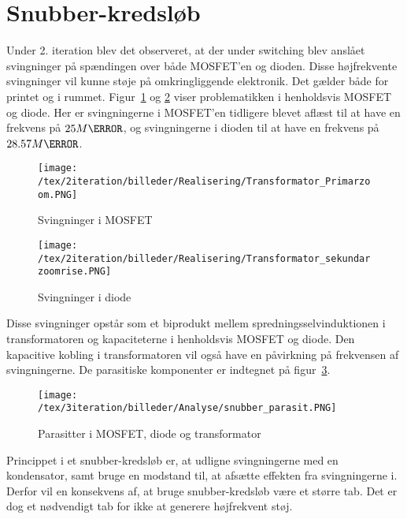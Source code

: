 
\section{Snubber-kredsløb}
Under 2. iteration blev det observeret, at der under switching blev anslået svingninger på spændingen over både MOSFET'en og dioden. Disse højfrekvente svingninger vil kunne støje på omkringliggende elektronik. Det gælder både for printet og i rummet. Figur~\ref{fig:MOSFET_svingninger_2} og \ref{fig:diode_svingninger_2} viser problematikken i henholdsvis MOSFET og diode. Her er svingningerne i MOSFET'en tidligere blevet aflæst til at have en frekvens på $25M\hertz$, og svingningerne i dioden til at have en frekvens på $28.57M\hertz$. 

\begin{figure}[H]
	\center
	\texttt{[image: /tex/2iteration/billeder/Realisering/Transformator\_Primarzoom.PNG]}
	\caption{Svingninger i MOSFET}
	\label{fig:MOSFET_svingninger_2}
\end{figure}

\begin{figure}[H]
	\center
	\texttt{[image: /tex/2iteration/billeder/Realisering/Transformator\_sekundarzoomrise.PNG]}
	\caption{Svingninger i diode}
	\label{fig:diode_svingninger_2}
\end{figure}


\noindent Disse svingninger opstår som et biprodukt mellem spredningsselvinduktionen i transformatoren og kapaciteterne i henholdsvis MOSFET og diode. Den kapacitive kobling i transformatoren vil også have en påvirkning på frekvensen af svingningerne. De parasitiske komponenter er indtegnet på figur~\ref{fig:snubber_parasit}\cite{snubber_parasit}.  

\begin{figure}[H]
	\center
	\texttt{[image: /tex/3iteration/billeder/Analyse/snubber\_parasit.PNG]}
	\caption{Parasitter i MOSFET, diode og transformator}
	\label{fig:snubber_parasit}
\end{figure}

\noindent Princippet i et snubber-kredsløb er, at udligne svingningerne med en kondensator, samt bruge en modstand til, at afsætte effekten fra svingningerne i. Derfor vil en konsekvens af, at bruge snubber-kredsløb være et større tab. Det er dog et nødvendigt tab for ikke at generere højfrekvent støj. 

